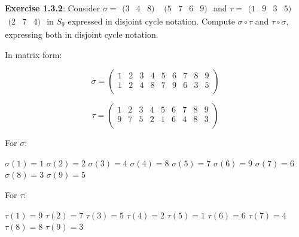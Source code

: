\documentclass[a4paper]{article}
\begin{document}
\begin{myparindent}{0pt}
\textbf{Exercise 1.3.2}:
\noindent Consider $\sigma = \begin{array}{rrr} (3 & 4 & 8) \end{array}$  $\begin{array}{rrrr} (5 & 7 & 6 & 9) \end{array}$
and $\tau = \begin{array}{rrrr} (1 & 9 & 3 & 5) \end{array}$ $\begin{array}{rrrr} (2 & 7 & 4) \end{array}$
in $S_9$ expressed in disjoint cycle notation.
Compute $\sigma \circ \tau$ and $\tau \circ \sigma$, expressing both in disjoint cycle notation. \newline

In matrix form:

\[
    \sigma =
    \begin{pmatrix}
        1 & 2 & 3 & 4 & 5 & 6 & 7 & 8 & 9 \\
        1 & 2 & 4 & 8 & 7 & 9 & 6 & 3 & 5 \\
    \end{pmatrix}
\]

\[
    \tau =
    \begin{pmatrix}
        1 & 2 & 3 & 4 & 5 & 6 & 7 & 8 & 9 \\
        9 & 7 & 5 & 2 & 1 & 6 & 4 & 8 & 3 \\
    \end{pmatrix}
\]

For $\sigma$:

$\sigma(1) = 1$ \newline
$\sigma(2) = 2$ \newline
$\sigma(3) = 4$ \newline
$\sigma(4) = 8$ \newline
$\sigma(5) = 7$ \newline
$\sigma(6) = 9$ \newline
$\sigma(7) = 6$ \newline
$\sigma(8) = 3$ \newline
$\sigma(9) = 5$ \newline

For $\tau$:

$\tau(1) = 9$ \newline
$\tau(2) = 7$ \newline
$\tau(3) = 5$ \newline
$\tau(4) = 2$ \newline
$\tau(5) = 1$ \newline
$\tau(6) = 6$ \newline
$\tau(7) = 4$ \newline
$\tau(8) = 8$ \newline
$\tau(9) = 3$ \newline


\end{myparindent}
\end{document}
